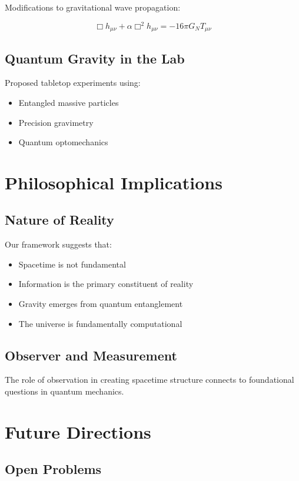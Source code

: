 \documentclass[12pt,a4paper]{article}
\begin{document}
Modifications to gravitational wave propagation:

\begin{equation}
\Box h_{\mu\nu} + \alpha \Box^2 h_{\mu\nu} = -16\pi G_N T_{\mu\nu}
\end{equation}

\subsection{Quantum Gravity in the Lab}

Proposed tabletop experiments using:
\begin{itemize}
\item Entangled massive particles
\item Precision gravimetry
\item Quantum optomechanics
\end{itemize}

\section{Philosophical Implications}

\subsection{Nature of Reality}

Our framework suggests that:
\begin{itemize}
\item Spacetime is not fundamental
\item Information is the primary constituent of reality
\item Gravity emerges from quantum entanglement
\item The universe is fundamentally computational
\end{itemize}

\subsection{Observer and Measurement}

The role of observation in creating spacetime structure connects to foundational questions in quantum mechanics.

\section{Future Directions}

\subsection{Open Problems}
\end{document}
